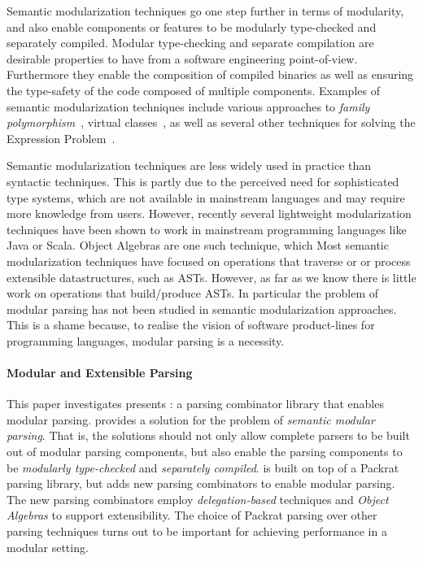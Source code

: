 Semantic modularization techniques go one step further in terms of modularity,
and also enable components or features to be modularly type-checked
and separately compiled. Modular type-checking and separate
compilation are desirable properties to have from a software
engineering point-of-view. Furthermore they enable the composition of compiled
binaries as well as ensuring the type-safety of the code composed of
multiple components. Examples of semantic modularization techniques 
include various approaches to \emph{family polymorphism}~\cite{},
virtual classes~\cite{}, as 
well as several other techniques for solving the Expression Problem~\cite{}. 

Semantic modularization techniques are less widely used in practice 
than syntactic techniques. This is partly due to the perceived need
for sophisticated type systems, which are not available in mainstream 
languages and may require more knowledge from users. However, recently 
several lightweight modularization techniques have been shown to work 
in mainstream programming languages like Java or Scala. Object
Algebras are one such technique, which 
Most semantic
modularization techniques have focused on operations that traverse or 
or process extensible datastructures, such as ASTs.
 However, as far as
we know there is little work on operations that build/produce ASTs. 
In particular the problem of modular parsing has not been studied in
semantic modularization approaches. This is a shame because, to
realise the vision of software product-lines for programming
languages, modular parsing is a necessity. 

\paragraph{Modular and Extensible Parsing}
  This paper investigates presents \name: a parsing
  combinator library that enables modular parsing.
  \name provides a solution for the problem of \emph{semantic modular
    parsing}. That is, the solutions should not only
  allow complete parsers to be built out of modular parsing
  components, but also enable the parsing components to be \emph{modularly
  type-checked} and \emph{separately compiled}. \name is
  built on top of a Packrat parsing library, but adds new parsing
  combinators to enable modular parsing. The new parsing combinators 
  employ \emph{delegation-based} techniques and \emph{Object Algebras} 
  to support extensibility. The choice of Packrat parsing over other
  parsing techniques turns out to be important for achieving
  performance in a modular setting.  

